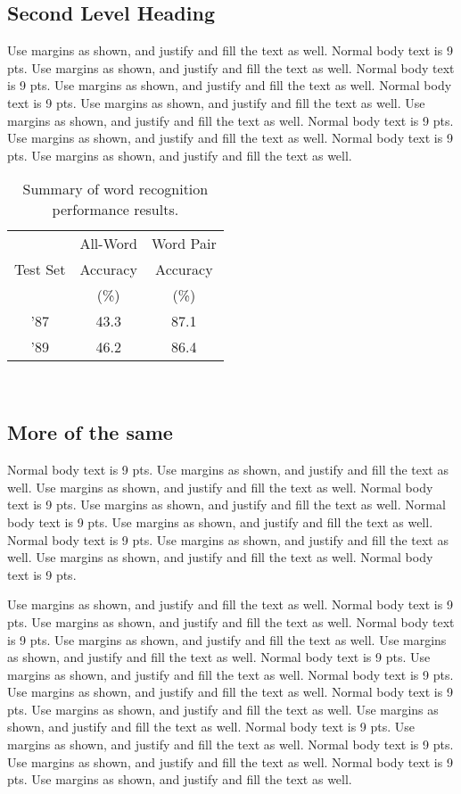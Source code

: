 \subsection{Second Level Heading}
Use margins as shown, and justify and fill the text as well.   Normal body text is 9 pts. Use margins as shown, and justify and fill the text as well.   Normal body text is 9 pts. Use margins as shown, and justify and fill the text as well.   Normal body text is 9 pts. Use margins as shown, and justify and fill the text as well.   
Use margins as shown, and justify and fill the text as well.   Normal body text is 9 pts. Use margins as shown, and justify and fill the text as well.   Normal body text is 9 pts. Use margins as shown, and justify and fill the text as well\cite{LEE,RUDNICKY}. 

\begin{table}[h]
\begin{center}
\begin{tabular}{|c|c|c|}
\hline
& All-Word & Word Pair\\
Test Set & Accuracy & Accuracy\\
& (\%) & (\%)\\
\hline
'87 & 43.3 & 87.1\\
\hline
'89 & 46.2 & 86.4\\
\hline
\end{tabular}\\
\end{center}
\caption{Summary of word recognition performance results.}
\label{word-accuracy}
\end{table}

\subsection{More of the same}
  Normal body text is 9 pts. Use margins as shown, and justify and fill the text as well.   
Use margins as shown, and justify and fill the text as well.   Normal body text is 9 pts. Use margins as shown, and justify and fill the text as well.   Normal body text is 9 pts. Use margins as shown, and justify and fill the text as well.   Normal body text is 9 pts. Use margins as shown, and justify and fill the text as well.   
Use margins as shown, and justify and fill the text as well.   Normal body text is 9 pts.

 Use margins as shown, and justify and fill the text as well.   Normal body text is 9 pts. Use margins as shown, and justify and fill the text as well.   Normal body text is 9 pts. Use margins as shown, and justify and fill the text as well.   
Use margins as shown, and justify and fill the text as well.   Normal body text is 9 pts. Use margins as shown, and justify and fill the text as well.   Normal body text is 9 pts. Use margins as shown, and justify and fill the text as well.   Normal body text is 9 pts. Use margins as shown, and justify and fill the text as well.   
Use margins as shown, and justify and fill the text as well.   Normal body text is 9 pts. Use margins as shown, and justify and fill the text as well.   Normal body text is 9 pts. Use margins as shown, and justify and fill the text as well.   Normal body text is 9 pts. Use margins as shown, and justify and fill the text as well.   

